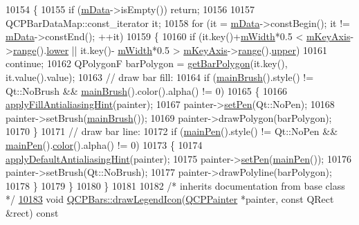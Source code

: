 \begin{DoxyCode}
10154 \{
10155   \textcolor{keywordflow}{if} (\hyperlink{a00027_aef28d29d51ef84b608ecd22c55d531ff}{mData}->isEmpty()) \textcolor{keywordflow}{return};
10156   
10157   QCPBarDataMap::const\_iterator it;
10158   \textcolor{keywordflow}{for} (it = \hyperlink{a00027_aef28d29d51ef84b608ecd22c55d531ff}{mData}->constBegin(); it != \hyperlink{a00027_aef28d29d51ef84b608ecd22c55d531ff}{mData}->constEnd(); ++it)
10159   \{
10160     \textcolor{keywordflow}{if} (it.key()+\hyperlink{a00027_a7c4e0f2246f8133f48a9c3f24cf5b920}{mWidth}*0.5 < \hyperlink{a00024_a692421b963472fa6e16156a74ba96832}{mKeyAxis}->\hyperlink{a00025_ab1ea79a4f5ea4cf42620f8f51c477ac4}{range}().\hyperlink{a00049_aa3aca3edb14f7ca0c85d912647b91745}{lower} || it.key()-
      \hyperlink{a00027_a7c4e0f2246f8133f48a9c3f24cf5b920}{mWidth}*0.5 > \hyperlink{a00024_a692421b963472fa6e16156a74ba96832}{mKeyAxis}->\hyperlink{a00025_ab1ea79a4f5ea4cf42620f8f51c477ac4}{range}().\hyperlink{a00049_ae44eb3aafe1d0e2ed34b499b6d2e074f}{upper})
10161       \textcolor{keywordflow}{continue};
10162     QPolygonF barPolygon = \hyperlink{a00027_a1d118a76662cfd691a78c6f573e3f78c}{getBarPolygon}(it.key(), it.value().value);
10163     \textcolor{comment}{// draw bar fill:}
10164     \textcolor{keywordflow}{if} (\hyperlink{a00024_ae74c123832da180c17e22203e748d9b7}{mainBrush}().style() != Qt::NoBrush && \hyperlink{a00024_ae74c123832da180c17e22203e748d9b7}{mainBrush}().color().alpha() != 0)
10165     \{
10166       \hyperlink{a00024_ac08a480155895e674dbfe5a5670e0ff3}{applyFillAntialiasingHint}(painter);
10167       painter->\hyperlink{a00047_af9c7a4cd1791403901f8c5b82a150195}{setPen}(Qt::NoPen);
10168       painter->setBrush(\hyperlink{a00024_ae74c123832da180c17e22203e748d9b7}{mainBrush}());
10169       painter->drawPolygon(barPolygon);
10170     \}
10171     \textcolor{comment}{// draw bar line:}
10172     \textcolor{keywordflow}{if} (\hyperlink{a00024_a19276ed2382a3a06464417b8788b1451}{mainPen}().style() != Qt::NoPen && \hyperlink{a00024_a19276ed2382a3a06464417b8788b1451}{mainPen}().\hyperlink{a00116_ae35093fbf4f645dcefd930ca8c68b622}{color}().alpha() != 0)
10173     \{
10174       \hyperlink{a00024_a76e9d6cc7972dc1528f526d163766aca}{applyDefaultAntialiasingHint}(painter);
10175       painter->\hyperlink{a00047_af9c7a4cd1791403901f8c5b82a150195}{setPen}(\hyperlink{a00024_a19276ed2382a3a06464417b8788b1451}{mainPen}());
10176       painter->setBrush(Qt::NoBrush);
10177       painter->drawPolyline(barPolygon);
10178     \}
10179   \}
10180 \}
10181 
10182 \textcolor{comment}{/* inherits documentation from base class */}
\hypertarget{a00115_source_l10183}{}\hyperlink{a00027_af54543a87581003b3176d8b2931754c5}{10183} \textcolor{keywordtype}{void} \hyperlink{a00027_af54543a87581003b3176d8b2931754c5}{QCPBars::drawLegendIcon}(\hyperlink{a00047}{QCPPainter} *painter, \textcolor{keyword}{const} QRect &rect)\textcolor{keyword}{ const}

\end{DoxyCode}

